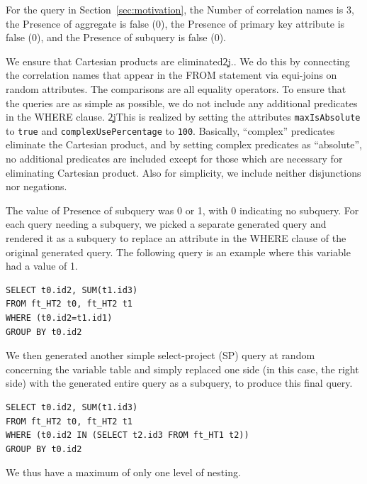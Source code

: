 \documentclass[prodmode,acmtods]{acmsmall}
\begin{document}
For the query in Section~\ref{sec:motivation}, the Number of correlation
names is 3, the Presence of aggregate
is false (0), the Presence of primary key attribute is false (0),
and the Presence of subquery is false (0).

{}We ensure that Cartesian products are
eliminated\c2j{.}{.}  We do this by
connecting the correlation names that appear in the FROM statement via
equi-joins on random attributes. The comparisons are all
equality operators. To ensure that the queries are as simple as possible, we
do not include any additional predicates in the WHERE clause.  \c2j{}{This
  is realized by setting the attributes {\tt maxIsAbsolute} to {\tt true}
  and {\tt complexUsePercentage} to {\tt 100}.  Basically, ``complex''
  predicates eliminate the Cartesian product, and by setting complex
  predicates as ``absolute'', no additional predicates are included except
  for those which are necessary for eliminating Cartesian product.} Also
for simplicity, we include neither disjunctions nor negations.


The value of Presence of subquery was 0 or 1, with 0 indicating no
subquery. For each query needing a subquery, we picked a separate generated query and
rendered it as a subquery to replace an attribute in the WHERE clause of the
original generated query. The following query is an example where this
variable had a value of 1.

\begin{verbatim}
SELECT t0.id2, SUM(t1.id3)
FROM ft_HT2 t0, ft_HT2 t1
WHERE (t0.id2=t1.id1)
GROUP BY t0.id2
\end{verbatim}

We then generated another simple select-project (SP) 
query at random concerning the variable table 
and simply replaced one side (in this case, the right side) with the generated entire 
query as a subquery, to produce this final query.

\begin{verbatim}
SELECT t0.id2, SUM(t1.id3)
FROM ft_HT2 t0, ft_HT2 t1
WHERE (t0.id2 IN (SELECT t2.id3 FROM ft_HT1 t2)) 
GROUP BY t0.id2
\end{verbatim}
We thus have a maximum of only one level of nesting.
\end{document}
